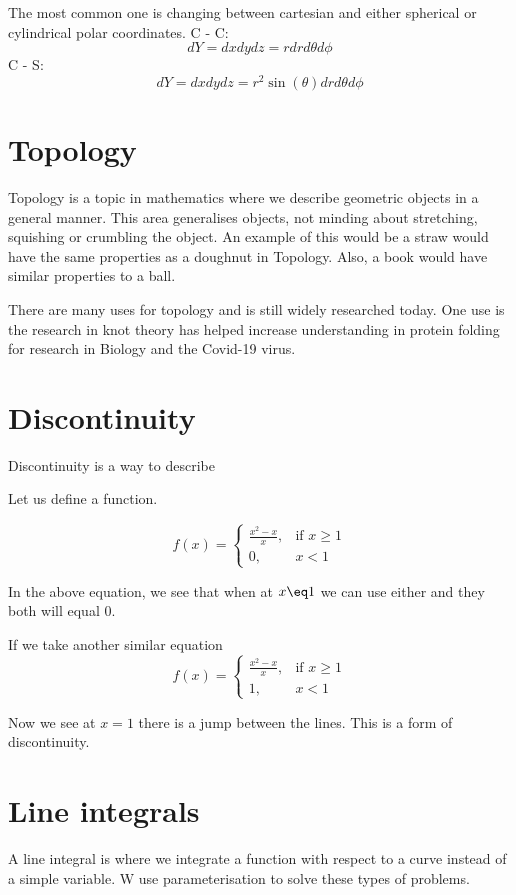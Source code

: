 \documentclass{article}
\begin{document}
The most common one is changing between cartesian and either spherical or cylindrical polar coordinates.
C - C:
$$ dY = dx dy dz = r dr d\theta d\phi $$
C - S:
$$ dY = dx dy dz = r^2 \sin(\theta) dr d\theta d\phi $$


\section{Topology}
Topology is a topic in mathematics where we describe geometric objects in a general manner. This area generalises objects, not minding about stretching, squishing or crumbling the object. An example of this would be a straw would have the same properties as a doughnut in Topology. Also, a book would have similar properties to a ball.

There are many uses for topology and is still widely researched today. One use is the research in knot theory has helped increase understanding in protein folding for research in Biology and the Covid-19 virus. 


\section{Discontinuity}
Discontinuity is a way to describe 

Let us define a function.

\begin{equation}
    f(x)=
    \begin{cases}
        \frac{x^2-x}{x},& \text{if } x\geq 1\\
        0,              & x < 1
    \end{cases}
\end{equation}


In the above equation, we see that when at $x \eq 1$ we can use either and they both will equal 0.

If we take another similar equation 
\begin{equation}
    f(x)=
    \begin{cases}
        \frac{x^2-x}{x},& \text{if } x\geq 1\\
        1,              & x < 1
    \end{cases}
\end{equation}

Now we see at $ x = 1$ there is a jump between the lines. This is a form of discontinuity.

\section{Line integrals}
A line integral is where we integrate a function with respect to a curve instead of a simple variable. W use parameterisation to solve these types of problems.
\end{document}
